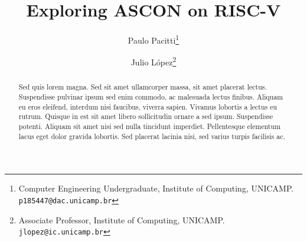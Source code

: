 \documentclass[11pt,twoside]{article}
\begin{document}
% 

%



\TRMakeCover


%
\pagestyle{myheadings}
\thispagestyle{empty}

%
\title{Exploring ASCON on RISC-V}

\author{Paulo Pacitti\thanks{Computer Engineering Undergraduate, Institute of Computing, UNICAMP. \texttt{p185447@dac.unicamp.br}} \and
Julio  López\thanks{Associate Professor, Institute of Computing, UNICAMP. \texttt{jlopez@ic.unicamp.br}}}
\date{}
\maketitle


\begin{abstract} 
  Sed quis lorem magna. Sed sit amet ullamcorper massa, sit amet placerat lectus. 
  Suspendisse pulvinar ipsum sed enim commodo, ac malesuada lectus finibus. Aliquam eu 
  eros eleifend, interdum nisi faucibus, viverra sapien. Vivamus lobortis a lectus eu rutrum. 
  Quisque in est sit amet libero sollicitudin ornare a sed ipsum. Suspendisse potenti. 
  Aliquam sit amet nisi sed nulla tincidunt imperdiet. Pellentesque elementum lacus eget
  dolor gravida lobortis. Sed placerat lacinia nisi, sed varius turpis facilisis ac. 
\end{abstract}
\end{document}
